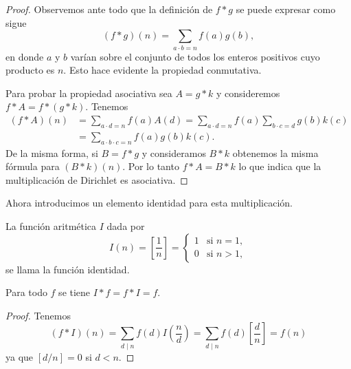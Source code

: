 \documentclass[12pt,a4paper]{book}
\begin{document}
    \begin{proof}
        Observemos ante todo que la definición de $f*g$ se puede expresar como sigue
        \begin{equation*}
            (f*g)(n)=\sum_{a\cdot b=n}f(a)g(b),
        \end{equation*}
        en donde $a$ y $b$ varían sobre el conjunto de todos los enteros positivos cuyo
        producto es $n$. Esto hace evidente la propiedad conmutativa.

        Para probar la propiedad asociativa sea $A=g*k$ y consideremos $f*A=f*(g*k)$.
        Tenemos
        \begin{align*}
            (f*A)(n)&=\sum_{a\cdot d=n}f(a)A(d)=\sum_{a\cdot d=n}f(a)\sum_{b\cdot c=d}g(b)k(c)\\
            &=\sum_{a\cdot b\cdot c=n}f(a)g(b)k(c).
        \end{align*}
        De la misma forma, si $B=f*g$ y consideramos $B*k$ obtenemos la misma fórmula para
        $(B*k)(n)$. Por lo tanto $f*A=B*k$ lo que indica que la multiplicación de Dirichlet
        es asociativa.
    \end{proof}

    Ahora introducimos un elemento identidad para esta multiplicación.

    \begin{definicion}
        La función aritmética $I$ dada por
        \begin{equation*}
            I(n)=\left[\frac{1}{n}\right]=
            \begin{cases}
                1 & \text{si } n=1,\\
                0 & \text{si } n>1,
            \end{cases}
        \end{equation*}
        se llama la función identidad.
    \end{definicion}

    \begin{teorema}
        Para todo $f$ se tiene $I*f=f*I=f$.
    \end{teorema}

    \begin{proof}
        Tenemos
        \begin{equation*}
            (f*I)(n)=\sum_{d\mid n}f(d)I\left(\frac{n}{d}\right)
            =\sum_{d\mid n}f(d)\left[\frac{d}{n}\right]=f(n)
        \end{equation*}
        ya que $[d/n]=0$ si $d<n$.
    \end{proof}
\end{document}
